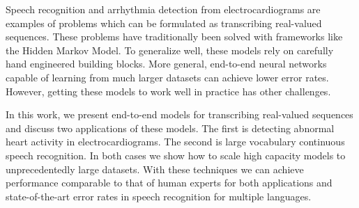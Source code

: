 
\beforepreface
{}

Speech recognition and arrhythmia detection from electrocardiograms are
examples of problems which can be formulated as transcribing real-valued
sequences. These problems have traditionally been solved with frameworks like
the Hidden Markov Model. To generalize well, these models rely on carefully
hand engineered building blocks. More general, end-to-end neural networks
capable of learning from much larger datasets can achieve lower error rates.
However, getting these models to work well in practice has other challenges.

In this work, we present end-to-end models for transcribing real-valued
sequences and discuss two applications of these models. The first is detecting
abnormal heart activity in electrocardiograms. The second is large vocabulary
continuous speech recognition. In both cases we show how to scale high capacity
models to unprecedentedly large datasets. With these techniques we can achieve
performance comparable to that of human experts for both applications and
state-of-the-art error rates in speech recognition for multiple languages.
